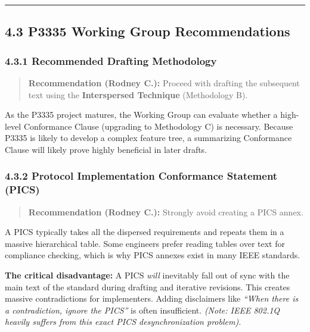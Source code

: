 \begin{center}\rule{0.5\linewidth}{0.5pt}\end{center}

\subsection{4.3 P3335 Working Group
Recommendations}\label{p3335-working-group-recommendations}

\subsubsection{4.3.1 Recommended Drafting
Methodology}\label{recommended-drafting-methodology}

\begin{quote}
\textbf{Recommendation (Rodney C.):} Proceed with drafting the
subsequent text using the \textbf{Interspersed Technique} (Methodology
B).
\end{quote}

As the P3335 project matures, the Working Group can evaluate whether a
high-level Conformance Clause (upgrading to Methodology C) is necessary.
Because P3335 is likely to develop a complex feature tree, a summarizing
Conformance Clause will likely prove highly beneficial in later drafts.

\subsubsection{4.3.2 Protocol Implementation Conformance Statement
(PICS)}\label{protocol-implementation-conformance-statement-pics}

\begin{quote}
\textbf{Recommendation (Rodney C.):} Strongly avoid creating a PICS
annex.
\end{quote}

A PICS typically takes all the dispersed requirements and repeats them
in a massive hierarchical table. Some engineers prefer reading tables
over text for compliance checking, which is why PICS annexes exist in
many IEEE standards.

\textbf{The critical disadvantage:} A PICS \emph{will} inevitably fall
out of sync with the main text of the standard during drafting and
iterative revisions. This creates massive contradictions for
implementers. Adding disclaimers like \emph{``When there is a
contradiction, ignore the PICS''} is often insufficient. \emph{(Note:
IEEE 802.1Q heavily suffers from this exact PICS desynchronization
problem).}

